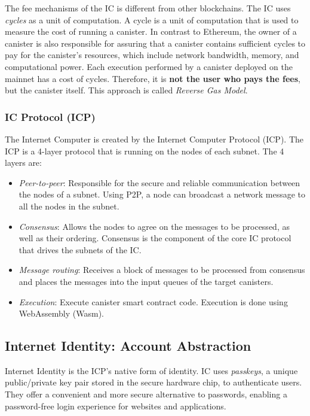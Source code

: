 The fee mechanisms of the IC is different from other blockchains. The IC uses \textit{cycles} as a unit of computation. A cycle is a unit of computation that is used to measure the cost of running a canister. In contrast to Ethereum, the owner of a canister is also responsible for assuring that a canister contains sufficient cycles to pay for the canister's resources, which include network bandwidth, memory, and computational power. Each execution performed by a canister deployed on the mainnet has a cost of cycles. Therefore, it is \textbf{not the user who pays the fees}, but the canister itself. \cite{icp-developer-journey} This approach is called \textit{Reverse Gas Model}. \cite{icp-reverse-gas-model}

\subsubsection{IC Protocol (ICP)}

The Internet Computer is created by the Internet Computer Protocol (ICP). The ICP is a 4-layer protocol that is running on the nodes of each subnet. The 4 layers are: \cite{icp-how-it-works}

\begin{itemize}
    \item \textit{Peer-to-peer}: Responsible for the secure and reliable communication between the nodes of a subnet. Using P2P, a node can broadcast a network message to all the nodes in the subnet.
    \item \textit{Consensus}: Allows the nodes to agree on the messages to be processed, as well as their ordering. Consensus is the component of the core IC protocol that drives the subnets of the IC.
    \item \textit{Message routing}: Receives a block of messages to be processed from consensus and places the messages into the input queues of the target canisters.
    \item \textit{Execution}: Execute canister smart contract code. Execution is done using WebAssembly (Wasm). 
\end{itemize}


\subsection{Internet Identity: Account Abstraction}

Internet Identity is the ICP's native form of identity. IC uses \textit{passkeys}, a unique public/private key pair stored in the secure hardware chip, to authenticate users. They offer a convenient and more secure alternative to passwords, enabling a password-free login experience for websites and applications. \cite{icp-identity}

